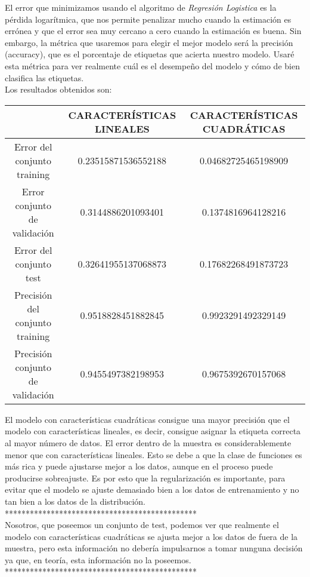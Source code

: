 \documentclass{article}
\begin{document}
El error que minimizamos usando el algoritmo de \textit{Regresión Logistica} es la pérdida logarítmica, que nos permite penalizar mucho cuando la estimación es errónea y que el error sea muy cercano a cero cuando la estimación es buena. Sin embargo, la métrica que usaremos para elegir el mejor modelo será la precisión (accuracy), que es el porcentaje de etiquetas que acierta nuestro modelo. Usaré esta métrica para ver realmente cuál es el desempeño del modelo y cómo de bien clasifica las etiquetas.\\

Los resultados obtenidos son:

\begin{center}
\begin{tabular}{|c|c|c|}
\hline
\multicolumn{1}{|c|}{}& \textbf{CARACTERÍSTICAS LINEALES} &
\textbf{CARACTERÍSTICAS CUADRÁTICAS}  \\ \hline
  Error del conjunto training       & 0.23515871536552188 & 0.04682725465198909 \\
  Error conjunto de validación      & 0.3144886201093401  & 0.1374816964128216 \\
  Error del conjunto test           & 0.32641955137068873 & 0.17682268491873723 \\
  Precisión del conjunto training   & 0.9518828451882845  & 0.9923291492329149 \\
  Precisión conjunto de validación  & 0.9455497382198953  & 0.9675392670157068 \\ \hline
\end{tabular}
\end{center}

El modelo con características cuadráticas consigue una mayor precisión que el modelo con características lineales, es decir, consigue asignar la etiqueta correcta al mayor número de datos. El error dentro de la muestra es considerablemente menor que con características lineales. Esto se debe a que la clase de funciones es más rica y puede ajustarse mejor a los datos, aunque en el proceso puede producirse sobreajuste. Es por esto que la regularización es importante, para evitar que el modelo se ajuste demasiado bien a los datos de entrenamiento y no tan bien a los datos de la distribución.\\

                    **********************************************\\
Nosotros, que poseemos un conjunto de test, podemos ver que realmente el modelo con características cuadráticas se ajusta mejor a los datos de fuera de la muestra, pero esta información no debería impulsarnos a tomar nunguna decisión ya que, en teoría, esta información no la poseemos.\\
                    **********************************************\\
\end{document}

